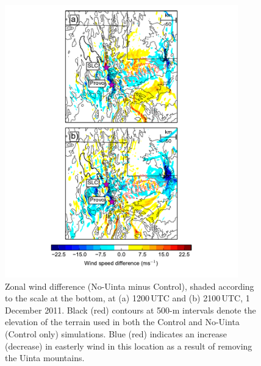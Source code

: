 \documentclass[pdftex,12pt]{article}
\begin{document}
\begin{figure}[t]
\includegraphics[width=0.9\textwidth]{eastdiff.pdf}
   \caption{Zonal wind difference (No-Uinta minus Control), shaded according to the scale at the bottom, at (a) 1200\,UTC and (b) 2100\,UTC, 1 December 2011. Black (red) contours at 500-m intervals denote the elevation of the terrain used in both the Control and No-Uinta (Control only) simulations. Blue (red) indicates an increase (decrease) in easterly wind in this location as a result of removing the Uinta mountains.}
   \label{fig:eastdiff}
\end{figure}
\end{document}
